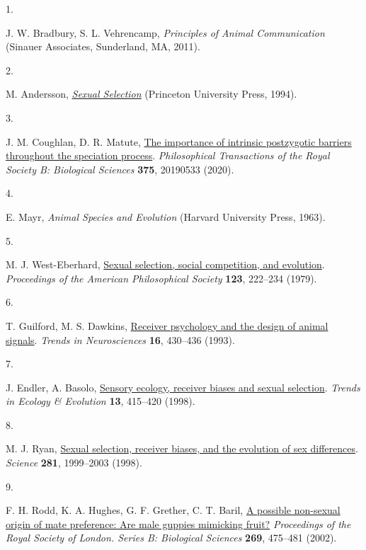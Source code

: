 \documentclass[
]{article}
\newlength{\cslhangindent}
\newlength{\csllabelwidth}
\newenvironment{CSLReferences}[2] %
 {\begin{list}{}{%
  \setlength{\itemindent}{0pt}
  \setlength{\leftmargin}{0pt}
  \setlength{\parsep}{0pt}
  \ifodd #1
   \setlength{\leftmargin}{\cslhangindent}
   \setlength{\itemindent}{-1\cslhangindent}
  \fi
  \setlength{\itemsep}{#2\baselineskip}}}
 {\end{list}}
\newcommand{\CSLLeftMargin}[1]{\parbox[t]{\csllabelwidth}{\strut#1\strut}}
\newcommand{\CSLRightInline}[1]{\parbox[t]{\linewidth - \csllabelwidth}{\strut#1\strut}}
\begin{document}
\label{refs}
\begin{CSLReferences}{0}{0}
\CSLLeftMargin{1. }%
\CSLRightInline{J. W. Bradbury, S. L. Vehrencamp, \emph{Principles of
Animal Communication} (Sinauer Associates, Sunderland, MA, 2011).}

\CSLLeftMargin{2. }%
\CSLRightInline{M. Andersson,
\emph{\href{https://www.ncbi.nlm.nih.gov/pubmed/21256434}{Sexual
Selection}} (Princeton University Press, 1994).}

\CSLLeftMargin{3. }%
\CSLRightInline{J. M. Coughlan, D. R. Matute,
\href{https://doi.org/10.1098/rstb.2019.0533}{The importance of
intrinsic postzygotic barriers throughout the speciation process}.
\emph{Philosophical Transactions of the Royal Society B: Biological
Sciences} \textbf{375}, 20190533 (2020).}

\CSLLeftMargin{4. }%
\CSLRightInline{E. Mayr, \emph{Animal Species and Evolution} (Harvard
University Press, 1963).}

\CSLLeftMargin{5. }%
\CSLRightInline{M. J. West-Eberhard,
\href{http://www.jstor.org/stable/986582}{Sexual selection, social
competition, and evolution}. \emph{Proceedings of the American
Philosophical Society} \textbf{123}, 222--234 (1979).}

\CSLLeftMargin{6. }%
\CSLRightInline{T. Guilford, M. S. Dawkins,
\href{https://doi.org/10.1016/0166-2236(93)90068-W}{Receiver psychology
and the design of animal signals}. \emph{Trends in Neurosciences}
\textbf{16}, 430--436 (1993).}

\CSLLeftMargin{7. }%
\CSLRightInline{J. Endler, A. Basolo,
\href{https://doi.org/10.1016/S0169-5347(98)01471-2}{Sensory ecology,
receiver biases and sexual selection}. \emph{Trends in Ecology \&
Evolution} \textbf{13}, 415--420 (1998).}

\CSLLeftMargin{8. }%
\CSLRightInline{M. J. Ryan,
\href{https://doi.org/10.1126/science.281.5385.1999}{Sexual selection,
receiver biases, and the evolution of sex differences}. \emph{Science}
\textbf{281}, 1999--2003 (1998).}

\CSLLeftMargin{9. }%
\CSLRightInline{F. H. Rodd, K. A. Hughes, G. F. Grether, C. T. Baril,
\href{https://doi.org/10.1098/rspb.2001.1891}{A possible non-sexual
origin of mate preference: Are male guppies mimicking fruit?}
\emph{Proceedings of the Royal Society of London. Series B: Biological
Sciences} \textbf{269}, 475--481 (2002).}


\end{CSLReferences}
\end{document}
